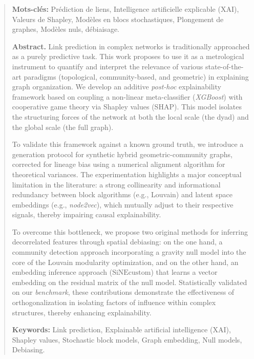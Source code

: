 \documentclass[runningheads]{llncs}
\begin{document}
\begin{quotation}
\begin{small}
\vspace{0.4cm}
\noindent \textbf{Mots-clés:} Prédiction de liens, Intelligence artificielle explicable (XAI), Valeurs de Shapley, Modèles en blocs stochastiques, Plongement de graphes, Modèles nuls, débiaisage.

\vspace{1.3cm} %

\noindent \textbf{Abstract.} Link prediction in complex networks is traditionally approached as a purely predictive task. This work proposes to use it as a metrological instrument to quantify and interpret the relevance of various state-of-the-art paradigms (topological, community-based, and geometric) in explaining graph organization. We develop an additive \textit{post-hoc} explainability framework based on coupling a non-linear meta-classifier (\textit{XGBoost}) with cooperative game theory via Shapley values (SHAP). This model isolates the structuring forces of the network at both the local scale (the dyad) and the global scale (the full graph).

To validate this framework against a known ground truth, we introduce a generation protocol for synthetic hybrid geometric-community graphs, corrected for lineage bias using a numerical alignment algorithm for theoretical variances. The experimentation highlights a major conceptual limitation in the literature: a strong collinearity and informational redundancy between block algorithms (e.g., Louvain) and latent space embeddings (e.g., \textit{node2vec}), which mutually adjust to their respective signals, thereby impairing causal explainability.

To overcome this bottleneck, we propose two original methods for inferring decorrelated features through spatial debiasing: on the one hand, a community detection approach incorporating a gravity null model into the core of the Louvain modularity optimization, and on the other hand, an embedding inference approach ($\text{SiNEcustom}$) that learns a vector embedding on the residual matrix of the null model. Statistically validated on our \textit{benchmark}, these contributions demonstrate the effectiveness of orthogonalization in isolating factors of influence within complex structures, thereby enhancing explainability.

\vspace{0.4cm}
\noindent \textbf{Keywords:} Link prediction, Explainable artificial intelligence (XAI), Shapley values, Stochastic block models, Graph embedding, Null models, Debiasing.
\end{small}
\end{quotation}
\addvspace{4.5em} 
\end{document}
